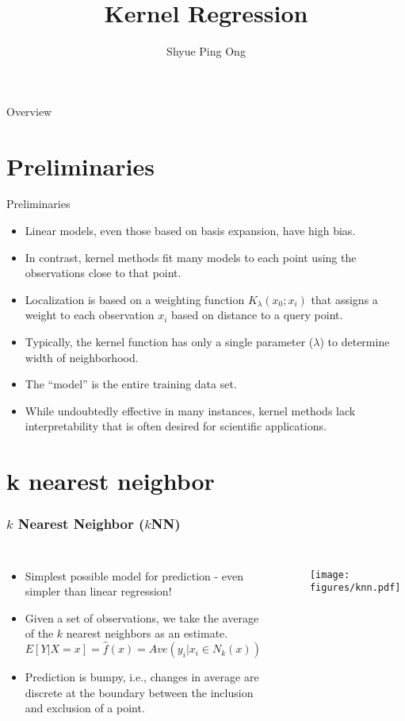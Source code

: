 \documentclass[aspectratio=169]{beamer}
\title[Kernel Regression]{Kernel Regression}
\author{Shyue Ping Ong}
\institute[UCSD]{University of California, San Diego\\
\medskip
}
\date{\classyear} %
\begin{document}
\begin{frame}
    \titlepage %
\end{frame}


\begin{frame}{Overview}
    \tableofcontents
\end{frame}


\section{Preliminaries}

\begin{frame}{Preliminaries}
    \begin{itemize}
        \item Linear models, even those based on basis expansion, have high bias.
        \item In contrast, kernel methods fit many models to each point using the observations close to that point.
        \item Localization is based on a weighting function $K_{\lambda}(x_0; x_i)$ that assigns a weight to each observation $x_i$ based on distance to a query point.
        \item Typically, the kernel function has only a single parameter ($\lambda$) to determine width of neighborhood.
        \item The ``model'' is the entire training data set.
        \item While undoubtedly effective in many instances, kernel methods lack interpretability that is often desired for scientific applications.
    \end{itemize}
\end{frame}

\section{k nearest neighbor}

\begin{frame}
\frametitle{$k$ Nearest Neighbor ($k$NN)}
\begin{columns}
    \begin{itemize}
        \item Simplest possible model for prediction - even simpler than linear regression!
        \item Given a set of observations, we take the average of the $k$ nearest neighbors as an estimate.
        \begin{equation*}
            E[Y|X=x] = \hat{f}(x) = Ave(y_i|x_i \in N_k(x))
        \end{equation*}
        \item Prediction is bumpy, i.e., changes in average are discrete at the boundary between the inclusion and exclusion of a point.
    \end{itemize}
\begin{figure}
            \centering
            \texttt{[image: figures/knn.pdf]}
        \end{figure}
\end{columns}
\end{frame}
\end{document}
